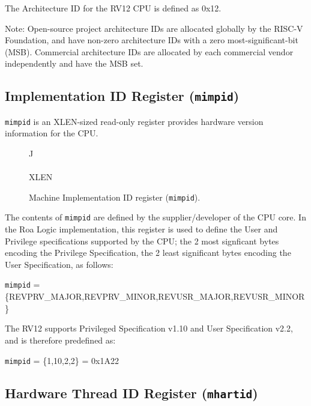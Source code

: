 \fi

The Architecture ID for the RV12 CPU is defined as 0x12.

Note: Open-source project architecture IDs are allocated globally by the
RISC-V Foundation, and have non-zero architecture IDs with a zero
most-significant-bit (MSB). Commercial architecture IDs are allocated by
each commercial vendor independently and have the MSB set.

\subsection{Implementation ID Register
(\texttt{mimpid})}\label{implementation-id-register-mimpid}

\texttt{mimpid} is an XLEN-sized read-only register provides hardware version
information for the CPU.

\ifdefined\MARKDOWN
\else

\begin{figure*}[htb]
	{\footnotesize
		\begin{center}
			\begin{tabular}{J}
				 \\
				\hline
				  \\
				\hline
				XLEN \\
			\end{tabular}
		\end{center}
	}
	\vspace{-0.1in}
	\caption{Machine Implementation ID register (\texttt{mimpid}).}
	\label{fig:mimpidreg}
\end{figure*}

\fi

The contents of \texttt{mimpid} are defined by the supplier/developer of the CPU
core. In the Roa Logic implementation, this register is used to define the User
and Privilege specifications supported by the CPU; the 2 most signficant bytes
encoding the Privilege Specification, the 2 least significant bytes encoding the
User Specification, as follows:

\texttt{mimpid} = \{REVPRV\_MAJOR,REVPRV\_MINOR,REVUSR\_MAJOR,REVUSR\_MINOR\}

The RV12 supports Privileged Specification v1.10 and User Specification v2.2,
and is therefore predefined as:

\texttt{mimpid} = \{1,10,2,2\} = 0x1A22

\subsection{Hardware Thread ID Register
(\texttt{mhartid})}\label{hardware-thread-id-register-mhartid}


